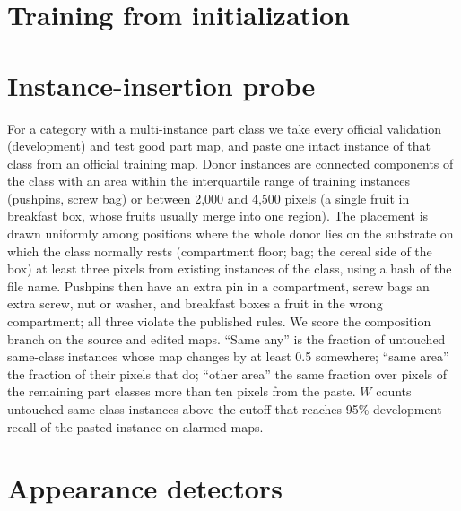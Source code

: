 \section{Training from initialization}
\label{sec:supp_scratch}


\section{Instance-insertion probe}
\label{sec:supp_insertion}
For a category with a multi-instance part class we take every official validation (development) and test good part map, and paste one intact instance of that class from an official training map. Donor instances are connected components of the class with an area within the interquartile range of training instances (pushpins, screw bag) or between 2{,}000 and 4{,}500 pixels (a single fruit in breakfast box, whose fruits usually merge into one region). The placement is drawn uniformly among positions where the whole donor lies on the substrate on which the class normally rests (compartment floor; bag; the cereal side of the box) at least three pixels from existing instances of the class, using a hash of the file name. Pushpins then have an extra pin in a compartment, screw bags an extra screw, nut or washer, and breakfast boxes a fruit in the wrong compartment; all three violate the published rules. We score the composition branch on the source and edited maps. ``Same any'' is the fraction of untouched same-class instances whose map changes by at least 0.5 somewhere; ``same area'' the fraction of their pixels that do; ``other area'' the same fraction over pixels of the remaining part classes more than ten pixels from the paste. $W$ counts untouched same-class instances above the cutoff that reaches 95\% development recall of the pasted instance on alarmed maps.
\begin{table}[t]
\centering
\caption{\textbf{Instance-insertion probe.} Composition branch, map-space edits of official test good maps. AUROC ranks the pasted instance against the untouched instances of its class. Splicing connectors were dropped because their contacts leave no free substrate for an extra instance.}
\label{tab:insertion}
\footnotesize\setlength{\tabcolsep}{3pt}

\end{table}

\section{Appearance detectors}
\label{sec:supp_appearance}
